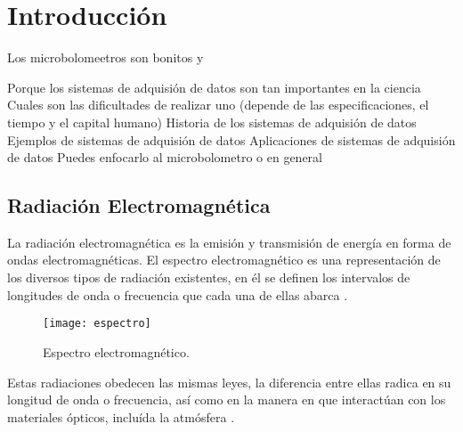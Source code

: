 \chapter{Introducción}


	Los microbolomeetros son bonitos y \cite{Hernandez2021}
	
	Porque los sistemas de adquisión de datos son tan importantes en la ciencia
	Cuales son las dificultades de realizar uno (depende de las especificaciones, el tiempo y el capital humano)
	Historia de los sistemas de adquisión de datos
	Ejemplos de sistemas de adquisión de datos
	Aplicaciones de sistemas de adquisión de datos
	Puedes enfocarlo al microbolometro o en general
    
    \section{Radiación Electromagnética}
    La radiación electromagnética es la emisión y transmisión de energía en forma de ondas electromagnéticas. El espectro electromagnético es una representación de los diversos tipos de radiación existentes, en él se definen los intervalos de longitudes de onda o frecuencia que cada una de ellas abarca \cite{Chang}.
            \begin{figure}[hbtp]
                \centering
                \texttt{[image: espectro]}
                \caption{Espectro electromagnético.}
                \label{fig:espectro}
            \end{figure}    
    
    Estas radiaciones obedecen las mismas leyes, la diferencia entre ellas radica en su longitud de onda o frecuencia, así como en la manera en que interactúan con los materiales ópticos, incluída la atmósfera \cite{Vincent}.
    
